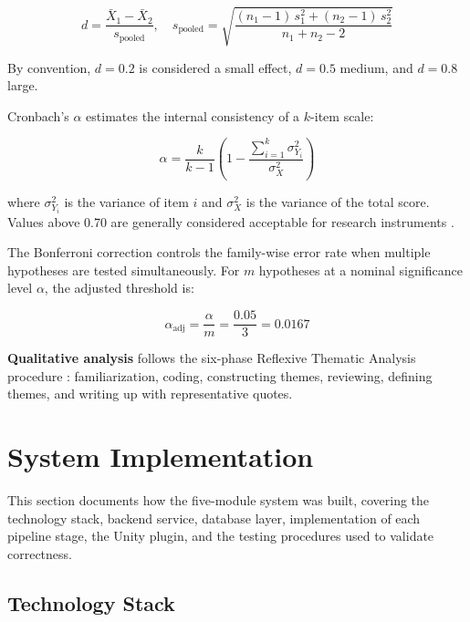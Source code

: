 \begin{equation}
d = \frac{\bar{X}_1 - \bar{X}_2}{s_{\text{pooled}}}, \quad s_{\text{pooled}} = \sqrt{\frac{(n_1 - 1)\,s_1^2 + (n_2 - 1)\,s_2^2}{n_1 + n_2 - 2}}
\label{eq:cohens_d}
\end{equation}

\noindent By convention, $d = 0.2$ is considered a small effect, $d = 0.5$ medium, and $d = 0.8$ large.

Cronbach's $\alpha$ estimates the internal consistency of a $k$-item scale:

\begin{equation}
\alpha = \frac{k}{k - 1}\left(1 - \frac{\sum_{i=1}^{k} \sigma_{Y_i}^2}{\sigma_X^2}\right)
\label{eq:cronbach}
\end{equation}

\noindent where $\sigma_{Y_i}^2$ is the variance of item $i$ and $\sigma_X^2$ is the variance of the total score. Values above 0.70 are generally considered acceptable for research instruments \citep{cohen1988statistical}.

The Bonferroni correction controls the family-wise error rate when multiple hypotheses are tested simultaneously. For $m$ hypotheses at a nominal significance level $\alpha$, the adjusted threshold is:

\begin{equation}
\alpha_{\text{adj}} = \frac{\alpha}{m} = \frac{0.05}{3} = 0.0167
\label{eq:bonferroni}
\end{equation}

\textbf{Qualitative analysis} follows the six-phase Reflexive Thematic Analysis procedure \citep{braun2022thematic}: familiarization, coding, constructing themes, reviewing, defining themes, and writing up with representative quotes.

\section{System Implementation}

This section documents how the five-module system was built, covering the technology stack, backend service, database layer, implementation of each pipeline stage, the Unity plugin, and the testing procedures used to validate correctness.

\subsection{Technology Stack}

